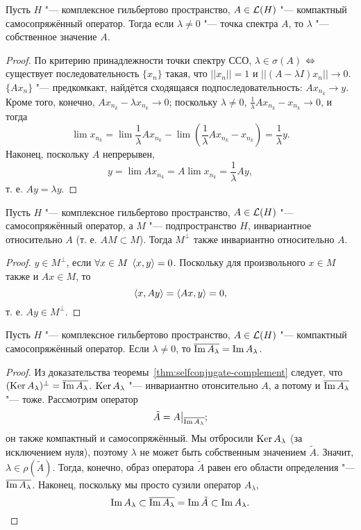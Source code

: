 \documentclass[main]{subfiles}
\begin{document}
\begin{lemma}
  Пусть \( H \) "--- комплексное гильбертово пространство,
  \( A \in \Linears{H} \) "--- компактный самосопряжённый оператор.
  Тогда если \( \lambda \ne 0 \) "--- точка спектра \( A \),
  то \( \lambda \) "--- собственное значение \( A \).
\end{lemma}
\begin{proof}
  По критерию принадлежности точки спектру ССО,
  \( \lambda \in \sigma(A) \) \(\Leftrightarrow\) 
  существует последовательность \( \{ x_n \} \)
  такая, что \( ||x_n|| = 1 \) и
  \( ||(A - \lambda I) x_n|| \to 0 \).
  \( \{ A x_n \} \) "--- предкомкакт,
  найдётся сходящаяся подпоследовательность:
  \( A x_{n_k} \to y \).
  Кроме того, конечно,
  \( A x_{n_k} - \lambda x_{n_k} \to 0 \);
  поскольку \( \lambda \ne 0 \),
  \( \frac1\lambda A x_{n_k} - x_{n_k} \to 0 \),
  и тогда
  \[
    \lim x_{n_k} = \lim \frac1\lambda A x_{n_k} - \lim (\frac1\lambda A x_{n_k} - x_{n_k}) =
    \frac1\lambda y.
  \]
  Наконец, поскольку \( A \) непрерывен,
  \[
    y = \lim A x_{n_k} = A \lim x_{n_k} = \frac1\lambda A y,
  \]
  т. е. \( A y = \lambda y \).
\end{proof}

\begin{lemma}%
  Пусть \( H \) "--- комплексное гильбертово пространство,
  \( A \in \Linears{H} \) "--- самосопряжённый оператор,
  а \( M \) "--- подпространство \( H \),
  инвариантное относительно \( A \)
  (т. е. \( AM \subset M \)).
  Тогда \( M^\perp \) также инвариантно
  относительно \( A \).
\end{lemma}
\begin{proof}
  \( y \in M^\perp \), если \( \forall {x \in M} \; \,
  \langle x, y \rangle = 0 \).
  Поскольку для произвольного \( x \in M \)
  также и \( Ax \in M \), то
  \[
    \langle x, Ay \rangle = \langle Ax, y \rangle = 0,
  \]
  т. е. \( Ay \in M^\perp \).
\end{proof}

\begin{lemma}%
  Пусть \( H \) "--- комплексное гильбертово пространство,
  \( A \in \Linears{H} \) "--- компактный самосопряжённый оператор.
  Если \( \lambda \ne 0 \),
  то \( \overline{\operatorname{Im} A_\lambda} = \operatorname{Im} A_\lambda \).
\end{lemma}
\begin{proof}
  Из доказательства теоремы~\ref{thm:selfconjugate-complement}
  следует, что \( (\operatorname{Ker} A_\lambda)^\perp = \overline{\operatorname{Im} A_\lambda} \).
  \( \operatorname{Ker} A_\lambda \) "--- инвариантно отонсительно \( A \),
  а потому и \( \overline{\operatorname{Im} A_\lambda} \) "--- тоже.
  Рассмотрим оператор
  \[ \tilde A = A \bigr|_{\overline{\operatorname{Im} A_\lambda}};\]
  он также компактный и самосопряжённый.
  Мы отбросили
  \( \operatorname{Ker} A_\lambda \) (за исключением нуля),
  поэтому  \( \lambda \)
  не может быть собственным значением \( \tilde A \).
  Значит, \( \lambda \in \rho(\tilde A) \).
  Тогда, конечно, образ оператора \( \tilde A \) равен
  его области определения "--- \( \overline{\operatorname{Im} A_\lambda} \).
  Наконец, поскольку мы просто сузили оператор \( A_\lambda \),
  \[
    \operatorname{Im} A_\lambda \subset
    \overline{\operatorname{Im} A_\lambda} =
    \operatorname{Im} \tilde A \subset
    \operatorname{Im} A_\lambda. \qedhere
  \]
\end{proof}
\end{document}
